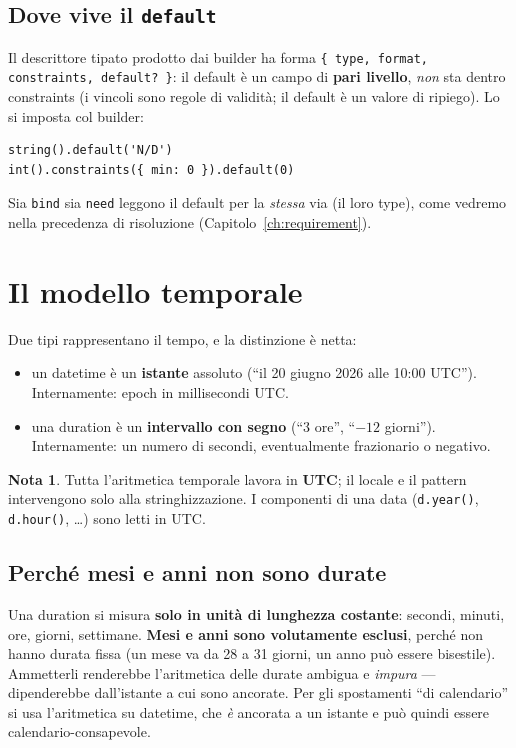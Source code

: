 \documentclass[11pt,a4paper]{book}
\let\code\lstinline
\newcommand{\ic}[1]{{\ttfamily #1}}
\theoremstyle{definition}
\newtheorem*{nota}{Nota}
\begin{document}
{{{{\subsection{Dove vive il \texttt{default}}

Il descrittore tipato prodotto dai builder ha forma
\verb|{ type, format, constraints, default? }|: il \ic{default} è un campo di
\textbf{pari livello}, \emph{non} sta dentro \ic{constraints} (i vincoli sono
regole di validità; il default è un valore di ripiego). Lo si imposta col builder:

\begin{lstlisting}
string().default('N/D')
int().constraints({ min: 0 }).default(0)
\end{lstlisting}

Sia \code|bind| sia \code|need| leggono il default per la \emph{stessa} via (il
loro \ic{type}), come vedremo nella precedenza di risoluzione
(Capitolo~\ref{ch:requirement}).

\section{Il modello temporale}

Due tipi rappresentano il tempo, e la distinzione è netta:

\begin{itemize}
  \item un \ic{datetime} è un \textbf{istante} assoluto (``il 20 giugno 2026 alle
    10:00 UTC''). Internamente: epoch in millisecondi UTC.
  \item una \ic{duration} è un \textbf{intervallo con segno} (``3 ore'', ``$-12$
    giorni''). Internamente: un numero di secondi, eventualmente frazionario o
    negativo.
\end{itemize}

\begin{nota}
Tutta l'aritmetica temporale lavora in \textbf{UTC}; il \ic{locale} e il
\ic{pattern} intervengono solo alla stringhizzazione. I componenti di una data
(\code|d.year()|, \code|d.hour()|, \ldots) sono letti in UTC.
\end{nota}

\subsection{Perché mesi e anni non sono durate}

Una \ic{duration} si misura \textbf{solo in unità di lunghezza costante}: secondi,
minuti, ore, giorni, settimane. \textbf{Mesi e anni sono volutamente esclusi},
perché non hanno durata fissa (un mese va da 28 a 31 giorni, un anno può essere
bisestile). Ammetterli renderebbe l'aritmetica delle durate ambigua e
\emph{impura} --- dipenderebbe dall'istante a cui sono ancorate. Per gli
spostamenti ``di calendario'' si usa l'aritmetica su \ic{datetime}, che \emph{è}
ancorata a un istante e può quindi essere calendario-consapevole.

}}}}
\end{document}
